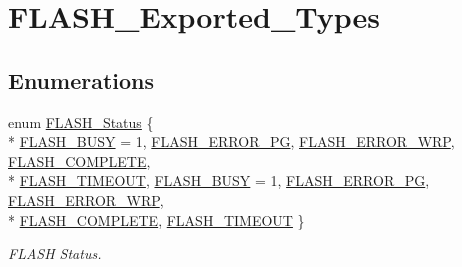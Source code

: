 \hypertarget{group___f_l_a_s_h___exported___types}{}\section{F\+L\+A\+S\+H\+\_\+\+Exported\+\_\+\+Types}
\label{group___f_l_a_s_h___exported___types}
\subsection*{Enumerations}
\begin{DoxyCompactItemize}
\item 
enum \hyperlink{group___f_l_a_s_h___exported___types_gadc63a6f3404ff1f71229a66915e9cdc0}{F\+L\+A\+S\+H\+\_\+\+Status} \{ \\*
\hyperlink{group___f_l_a_s_h___exported___types_ggadc63a6f3404ff1f71229a66915e9cdc0aa25021d41842af8a68cefcb65949e099}{F\+L\+A\+S\+H\+\_\+\+B\+U\+SY} = 1, 
\hyperlink{group___f_l_a_s_h___exported___types_ggadc63a6f3404ff1f71229a66915e9cdc0adcb0c5002fc757739886a2601a3981da}{F\+L\+A\+S\+H\+\_\+\+E\+R\+R\+O\+R\+\_\+\+PG}, 
\hyperlink{group___f_l_a_s_h___exported___types_ggadc63a6f3404ff1f71229a66915e9cdc0ac9e2d95d3ba415fb7392d72a2458f4d8}{F\+L\+A\+S\+H\+\_\+\+E\+R\+R\+O\+R\+\_\+\+W\+RP}, 
\hyperlink{group___f_l_a_s_h___exported___types_ggadc63a6f3404ff1f71229a66915e9cdc0ab0e88e9f59edee379a1a710a8b7deebf}{F\+L\+A\+S\+H\+\_\+\+C\+O\+M\+P\+L\+E\+TE}, 
\\*
\hyperlink{group___f_l_a_s_h___exported___types_ggadc63a6f3404ff1f71229a66915e9cdc0a90c514b6a619e3a4e6c2eec3154323f8}{F\+L\+A\+S\+H\+\_\+\+T\+I\+M\+E\+O\+UT}, 
\hyperlink{group___f_l_a_s_h___exported___types_ggadc63a6f3404ff1f71229a66915e9cdc0aa25021d41842af8a68cefcb65949e099}{F\+L\+A\+S\+H\+\_\+\+B\+U\+SY} = 1, 
\hyperlink{group___f_l_a_s_h___exported___types_ggadc63a6f3404ff1f71229a66915e9cdc0adcb0c5002fc757739886a2601a3981da}{F\+L\+A\+S\+H\+\_\+\+E\+R\+R\+O\+R\+\_\+\+PG}, 
\hyperlink{group___f_l_a_s_h___exported___types_ggadc63a6f3404ff1f71229a66915e9cdc0ac9e2d95d3ba415fb7392d72a2458f4d8}{F\+L\+A\+S\+H\+\_\+\+E\+R\+R\+O\+R\+\_\+\+W\+RP}, 
\\*
\hyperlink{group___f_l_a_s_h___exported___types_ggadc63a6f3404ff1f71229a66915e9cdc0ab0e88e9f59edee379a1a710a8b7deebf}{F\+L\+A\+S\+H\+\_\+\+C\+O\+M\+P\+L\+E\+TE}, 
\hyperlink{group___f_l_a_s_h___exported___types_ggadc63a6f3404ff1f71229a66915e9cdc0a90c514b6a619e3a4e6c2eec3154323f8}{F\+L\+A\+S\+H\+\_\+\+T\+I\+M\+E\+O\+UT}
 \}\begin{DoxyCompactList}\small\item\em F\+L\+A\+SH Status. \end{DoxyCompactList}

\end{DoxyCompactItemize}

